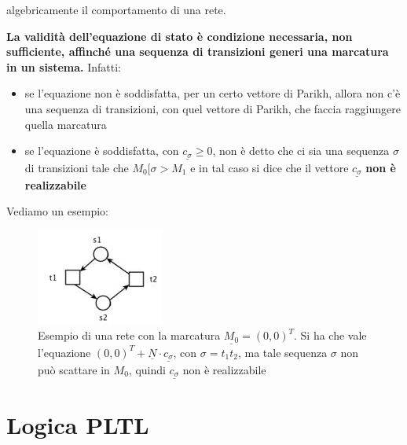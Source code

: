 \documentclass[a4paper,12pt, oneside]{book}
\begin{document}
\begin{definizione}
\begin{esempio}
    algebricamente il comportamento di una rete.
  \end{esempio}
  \textbf{La validità dell’equazione di stato è condizione necessaria, non
    sufficiente, affinché una sequenza di transizioni generi una marcatura in un
    sistema.} Infatti:
  \begin{itemize}
    \item se l’equazione non è soddisfatta, per un certo vettore di Parikh,
    allora non c’è una sequenza di transizioni, con quel vettore di Parikh, che
    faccia raggiungere quella marcatura
    \item se l’equazione è soddisfatta, con $\underline{c_\sigma}\geq 0$, non è
    detto che ci sia una sequenza $\sigma$ di transizioni tale che $M_0 [\sigma
    > M_1$ e in tal caso si dice che il vettore $\underline{c_\sigma}$
    \textbf{non è realizzabile}
  \end{itemize}
  \begin{esempio}
    Vediamo un esempio:
    \begin{figure}[H]
      \centering
      \includegraphics[scale = 0.6]{img/al7.jpg}
      \caption{Esempio di una rete con la marcatura
        $\underline{M_0}=(0,0)^T$. Si ha che vale l'equazione
        $(0,0)^T+\underline{N}\cdot \underline{c_\sigma}$, con $\sigma =t_1t_2$,
        ma tale sequenza $\sigma$ non può scattare in $M_0$, quindi
        $\underline{c_\sigma}$ non è realizzabile}
    \end{figure}
  \end{esempio}
\end{definizione}
\chapter{Logica PLTL}
\end{document}
